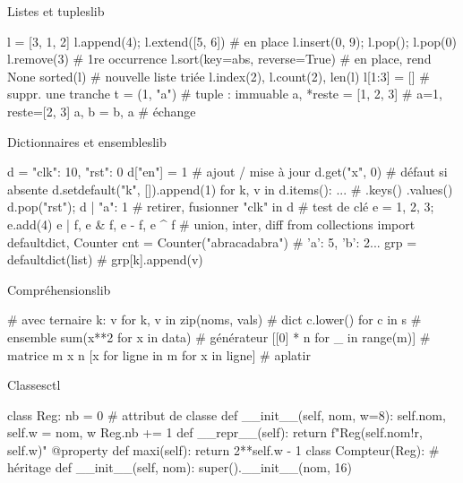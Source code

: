 \documentclass{article}
\begin{document}
\begin{colonne}
\begin{bloc}{Listes et tuples}{lib}
\begin{code}
l = [3, 1, 2]
l.append(4); l.extend([5, 6])  # en place
l.insert(0, 9); l.pop(); l.pop(0)
l.remove(3)                    # 1re occurrence
l.sort(key=abs, reverse=True)  # en place, rend None
sorted(l)                      # nouvelle liste triée
l.index(2), l.count(2), len(l)
l[1:3] = []                    # suppr. une tranche
t = (1, "a")                   # tuple : immuable
a, *reste = [1, 2, 3]          # a=1, reste=[2, 3]
a, b = b, a                    # échange
\end{code}
\end{bloc}

\begin{bloc}{Dictionnaires et ensembles}{lib}
\begin{code}
d = {"clk": 10, "rst": 0}
d["en"] = 1                   # ajout / mise à jour
d.get("x", 0)                 # défaut si absente
d.setdefault("k", []).append(1)
for k, v in d.items(): ...    # .keys() .values()
d.pop("rst"); d | {"a": 1}    # retirer, fusionner
"clk" in d                    # test de clé
e = {1, 2, 3}; e.add(4)
e | f, e & f, e - f, e ^ f    # union, inter, diff
from collections import defaultdict, Counter
cnt = Counter("abracadabra")  # {'a': 5, 'b': 2...}
grp = defaultdict(list)       # grp[k].append(v)
\end{code}
\end{bloc}

\begin{bloc}{Compréhensions}{lib}
\begin{code}
      # avec ternaire
{k: v for k, v in zip(noms, vals)}  # dict
{c.lower() for c in s}              # ensemble
sum(x**2 for x in data)             # générateur
[[0] * n for _ in range(m)]         # matrice m x n
[x for ligne in m for x in ligne]   # aplatir
\end{code}
\end{bloc}

\begin{bloc}{Classes}{ctl}
\begin{code}
class Reg:
    nb = 0            # attribut de classe
    def __init__(self, nom, w=8):
        self.nom, self.w = nom, w
        Reg.nb += 1
    def __repr__(self):
        return f"Reg({self.nom!r}, {self.w})"
    @property
    def maxi(self): return 2**self.w - 1
class Compteur(Reg):  # héritage
    def __init__(self, nom):
        super().__init__(nom, 16)
\end{code}
\end{bloc}
\end{colonne}
\end{document}
